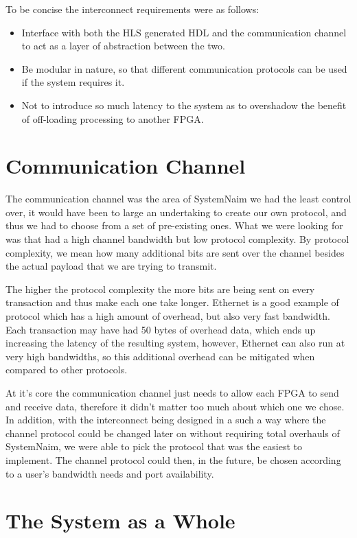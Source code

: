 To be concise the interconnect requirements were as follows:

\begin{itemize}
    \item Interface with both the HLS generated HDL and the communication channel to act as a layer of abstraction between the two.
    \item Be modular in nature, so that different communication protocols can be used if the system requires it.
    \item Not to introduce so much latency to the system as to overshadow the benefit of off-loading processing to another FPGA.
\end{itemize}

\section{Communication Channel}

The communication channel was the area of SystemNaim we had the least control over, it would have been to large an undertaking to create our own protocol, and thus we had to choose from a set of pre-existing ones. What we were looking for was that had a high channel bandwidth but low protocol complexity. By protocol complexity, we mean how many additional bits are sent over the channel besides the actual payload that we are trying to transmit.

The higher the protocol complexity the more bits are being sent on every transaction and thus make each one take longer. Ethernet is a good example of protocol which has a high amount of overhead, but also very fast bandwidth. Each transaction may have had 50 bytes of overhead data, which ends up increasing the latency of the resulting system, however, Ethernet can also run at very high bandwidths, so this additional overhead can be mitigated when compared to other protocols.

At it's core the communication channel just needs to allow each FPGA to send and receive data, therefore it didn't matter too much about which one we chose. In addition, with the interconnect being designed in a such a way where the channel protocol could be changed later on without requiring total overhauls of SystemNaim, we were able to pick the protocol that was the easiest to implement. The channel protocol could then, in the future, be chosen according to a user's bandwidth needs and port availability.

\section{The System as a Whole}
\label{sec:full_system}

